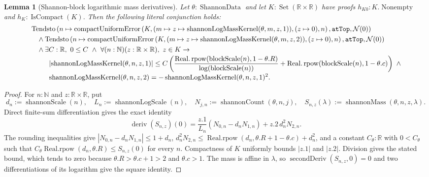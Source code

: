 \documentclass[9pt]{extarticle}
\newtheorem{lemma}{Lemma}[section]
\theoremstyle{definition}
\theoremstyle{remark}
\newcommand{\R}{\mathbb R}
\newcommand{\N}{\mathbb N}
\newcommand{\abs}[1]{\left\lvert #1\right\rvert}
\begin{document}
\begin{lemma}[Shannon-block logarithmic mass derivatives]
\label{lem:shannon-log-mass}
Let $\theta:\operatorname{ShannonData}$ and let
$K:\operatorname{Set}(\R\times\R)$ have proofs
$h_{K0}:K.\operatorname{Nonempty}$ and
$h_K:\operatorname{IsCompact}(K)$.  Then the
following literal conjunction holds:
\begin{align*}
&\operatorname{Tendsto}
 \left(n\mapsto\operatorname{compactUniformError}
  \left(K,(m\mapsto z\mapsto
    \operatorname{shannonLogMassKernel}(\theta,m,z,1)),
    (z\mapsto0),n\right),\texttt{atTop},\mathcal N(0)\right)\\
&\quad\wedge
 \operatorname{Tendsto}
 \left(n\mapsto\operatorname{compactUniformError}
  \left(K,(m\mapsto z\mapsto
    \operatorname{shannonLogMassKernel}(\theta,m,z,2)),
    (z\mapsto0),n\right),\texttt{atTop},\mathcal N(0)\right)\\
&\quad\wedge
 \exists C:\R,\ 0\leq C\ \wedge\
 \forall(n:\N)(z:\R\times\R),\ z\in K\to\\[-2pt]
&\hspace{9mm}
 \abs{\operatorname{shannonLogMassKernel}(\theta,n,z,1)}
 \leq C\left(
  \frac{\operatorname{Real.rpow}
    (\operatorname{blockScale}(n),1-\theta.R)}
       {\log(\operatorname{blockScale}(n))}
  +\operatorname{Real.rpow}
    (\operatorname{blockScale}(n),1-\theta.c)\right)\ 
 \wedge\\[-2pt]
&\hspace{9mm}
 \operatorname{shannonLogMassKernel}(\theta,n,z,2)
 =-\operatorname{shannonLogMassKernel}(\theta,n,z,1)^2.
\end{align*}
\end{lemma}

\begin{proof}
For $n:\N$ and $z:\R\times\R$, put
\[
 d_n:=\operatorname{shannonScale}(n),\quad
 L_n:=\operatorname{shannonLogScale}(n),\quad
 N_{j,n}:=\operatorname{shannonCount}(\theta,n,j),\quad
 S_{n,z}(\lambda):=\operatorname{shannonMass}(\theta,n,z,\lambda).
\]
Direct finite-sum differentiation gives the exact identity
\[
 \operatorname{deriv}(S_{n,z})(0)
 =\frac {z.1}{L_n}(N_{0,n}-d_nN_{1,n})
   +z.2\,d_n^2N_{2,n}.
\]
The rounding inequalities give
$\abs{N_{0,n}-d_nN_{1,n}}\leq1+d_n$,
$d_n^2N_{2,n}\leq
 \operatorname{Real.rpow}(d_n,\theta.R+1-\theta.c)+d_n^2$, and a constant
$C_\theta:\R$ with $0<C_\theta$ such that
$C_\theta\operatorname{Real.rpow}(d_n,\theta.R)\leq S_{n,z}(0)$ for every
$n$.  Compactness of
$K$ uniformly bounds $\abs{z.1}$ and $\abs{z.2}$.  Division gives the stated
bound, which tends to zero because
$\theta.R>\theta.c+1>2$ and $\theta.c>1$.  The mass is affine
in $\lambda$, so $\operatorname{secondDeriv}(S_{n,z},0)=0$ and two
differentiations of its logarithm give
the square identity.
\end{proof}
\end{document}
